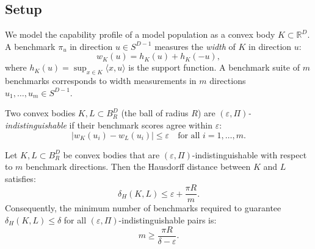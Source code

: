 
\subsection{Setup}

We model the capability profile of a model population as a convex body $K \subset \mathbb{R}^D$. A benchmark $\pi_u$ in direction $u \in S^{D-1}$ measures the \emph{width} of $K$ in direction $u$:
\[
  w_K(u) = h_K(u) + h_K(-u),
\]
where $h_K(u) = \sup_{x \in K} \langle x, u \rangle$ is the support function. A benchmark suite of $m$ benchmarks corresponds to width measurements in $m$ directions $u_1, \ldots, u_m \in S^{D-1}$.

\begin{definition}
Two convex bodies $K, L \subset B_R^D$ (the ball of radius $R$) are \emph{$(\varepsilon, \Pi)$-indistinguishable} if their benchmark scores agree within $\varepsilon$:
\[
  |w_K(u_i) - w_L(u_i)| \leq \varepsilon \quad \text{for all } i = 1, \ldots, m.
\]
\end{definition}

\begin{theorem}
\label{thm:indist}
Let $K, L \subset B_R^D$ be convex bodies that are $(\varepsilon, \Pi)$-indistinguishable with respect to $m$ benchmark directions. Then the Hausdorff distance between $K$ and $L$ satisfies:
\[
  \delta_H(K, L) \leq \varepsilon + \frac{\pi R}{m}.
\]
Consequently, the minimum number of benchmarks required to guarantee $\delta_H(K, L) \leq \delta$ for all $(\varepsilon, \Pi)$-indistinguishable pairs is:
\[
  m \geq \frac{\pi R}{\delta - \varepsilon}.
\]
\end{theorem}

